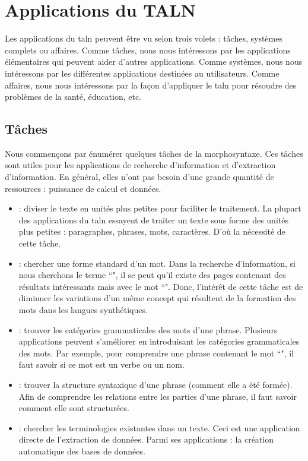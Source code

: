 \documentclass{KodeBook}
\begin{document}
\section{Applications du TALN}

Les applications du \ac{taln} peuvent être vu selon trois volets : tâches, systèmes complets ou affaires. 
Comme tâches, nous nous intéressons par les applications élémentaires qui peuvent aider d'autres applications. 
Comme systèmes, nous nous intéressons par les différentes applications destinées au utilisateurs. 
Comme affaires, nous nous intéressons par la façon d'appliquer le \ac{taln} pour résoudre des problèmes de la santé, éducation, etc.

\subsection{Tâches}

Nous commençons par énumérer quelques tâches de la morphosyntaxe. 
Ces tâches sont utiles pour les applications de recherche d'information et d'extraction d'information. 
En général, elles n'ont pas besoin d'une grande quantité de ressources : puissance de calcul et données.
\begin{itemize}
	\item {} : diviser le texte en unités plus petites pour faciliter le traitement. 
	La plupart des applications du \ac{taln} essayent de traiter un texte sous forme des unités plus petites : paragraphes, phrases, mots, caractères.
	D'où la nécessité de cette tâche.
	\item {} : chercher une forme standard d'un mot. 
	Dans la recherche d'information, si nous cherchons le terme ``", il se peut qu'il existe des pages contenant des résultats intéressants mais avec le mot ``". 
	Donc, l'intérêt de cette tâche est de diminuer les variations d'un même concept qui résultent de la formation des mots dans les langues synthétiques.
	\item {} : trouver les catégories grammaticales des mots d'une phrase. 
	Plusieurs applications peuvent s'améliorer en introduisant les catégories grammaticales des mots. 
	Par exemple, pour comprendre une phrase contenant le mot ``", il faut savoir si ce mot est un verbe ou un nom.
	\item {} : trouver la structure syntaxique d'une phrase (comment elle a été formée).
	Afin de comprendre les relations entre les parties d'une phrase, il faut savoir comment elle sont structurées.
	\item {} : chercher les terminologies existantes dans un texte. 
	Ceci est une application directe de l'extraction de données. 
	Parmi ses applications : la création automatique des bases de données.
\end{itemize}
\end{document}
